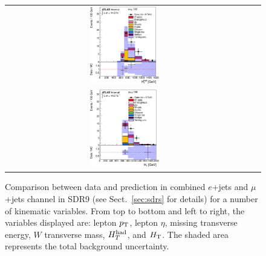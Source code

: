 \begin{figure}[h!]
\begin{center}
\begin{tabular}{ccc}
\includegraphics[width=0.30\textwidth]{appendices/figures/sdrs/HTHad_ELEMUONCR9_1W_NOMINAL.eps}  \\
\includegraphics[width=0.30\textwidth]{appendices/figures/sdrs/HTAll_ELEMUONCR9_1W_NOMINAL.eps}  &  &\\
\end{tabular}\caption{\small {Comparison between data and prediction in combined $e$+jets and $\mu$+jets channel in SDR9 (see Sect.~\ref{sec:sdrs} for details) 
for a number of kinematic variables. From top to bottom and left to right, the variables displayed are: lepton $\pt$, lepton $\eta$, missing transverse energy, $W$ transverse mass,
$\hthad$, and $\HT$. The shaded area represents the total background uncertainty.}}
\label{fig:ELEMUONCR9_1}
\end{center}
\end{figure}                                                                             

